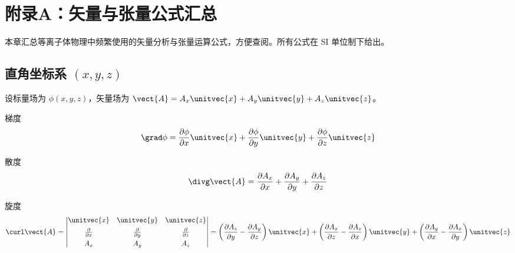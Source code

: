 
\chapter*{附录A：矢量与张量公式汇总}

本章汇总等离子体物理中频繁使用的矢量分析与张量运算公式，方便查阅。所有公式在 SI 单位制下给出。

\section{直角坐标系 $(x,y,z)$}

设标量场为 $\phi(x,y,z)$，矢量场为 $\vect{A}=A_x\unitvec{x}+A_y\unitvec{y}+A_z\unitvec{z}$。

\begin{definition}{梯度}{}
\begin{equation}
\grad\phi = \frac{\partial \phi}{\partial x}\unitvec{x} + \frac{\partial \phi}{\partial y}\unitvec{y} + \frac{\partial \phi}{\partial z}\unitvec{z}
\end{equation}
\end{definition}

\begin{definition}{散度}{}
\begin{equation}
\divg\vect{A} = \frac{\partial A_x}{\partial x} + \frac{\partial A_y}{\partial y} + \frac{\partial A_z}{\partial z}
\end{equation}
\end{definition}

\begin{definition}{旋度}{}
\begin{equation}
\curl\vect{A} =
\begin{vmatrix}
\unitvec{x} & \unitvec{y} & \unitvec{z} \\[4pt]
\frac{\partial }{\partial x} & \frac{\partial }{\partial y} & \frac{\partial }{\partial z} \\[4pt]
A_x & A_y & A_z
\end{vmatrix}
= \left(\frac{\partial A_z}{\partial y}-\frac{\partial A_y}{\partial z}\right)\unitvec{x}
+ \left(\frac{\partial A_x}{\partial z}-\frac{\partial A_z}{\partial x}\right)\unitvec{y}
+ \left(\frac{\partial A_y}{\partial x}-\frac{\partial A_x}{\partial y}\right)\unitvec{z}
\end{equation}
\end{definition}

